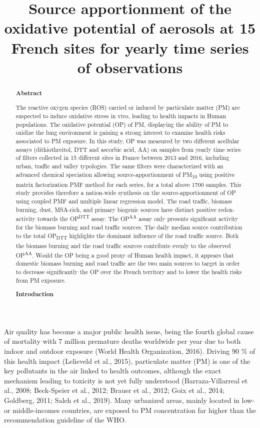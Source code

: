 \documentclass[
]{article}
\title{ Source apportionment of the oxidative potential of aerosols at
15 French sites for yearly time series of observations}
\author{}
\date{}
\begin{document}
\maketitle
\begin{abstract}
\textbf{Abstract}

The reactive oxygen species (ROS) carried or induced by particulate
matter (PM) are suspected to induce oxidative stress in vivo, leading to
health impacts in Human populations. The oxidative potential (OP) of PM,
displaying the ability of PM to oxidize the lung environment is gaining
a strong interest to examine health risks associated to PM exposure. In
this study, OP was measured by two different acellular assays
(dithiothreitol, DTT and ascorbic acid, AA) on samples from yearly time
series of filters collected in 15 different sites in France between 2013
and 2016, including urban, traffic and valley typologies. The same
filters were characterized with an advanced chemical speciation allowing
source-apportionment of PM\textsubscript{10} using positive matrix
factorization PMF method for each series, for a total above 1700
samples. This study provides therefore a nation-wide synthesis on the
source-apportionment of OP using coupled PMF and multiple linear
regression model. The road traffic, biomass burning, dust, MSA-rich, and
primary biogenic sources have distinct positive redox-activity towards
the OP\textsuperscript{DTT} assay. The OP\textsuperscript{AA} assay only
presents significant activity for the biomass burning and road traffic
sources. The daily median source contribution to the total
OP\textsubscript{DTT} highlights the dominant influence of the road
traffic source. Both the biomass burning and the road traffic sources
contribute evenly to the observed OP\textsuperscript{AA}. Would the OP
being a good proxy of Human health impact, it appears that domestic
biomass burning and road traffic are the two main sources to target in
order to decrease significantly the OP over the French territory and to
lower the health risks from PM exposure.

\textbf{Introduction}
\end{abstract}

Air quality has become a major public health issue, being the fourth
global cause of mortality with 7 million premature deaths worldwide per
year due to both indoor and outdoor exposure (World Health Organization,
2016). Driving 90 \% of this health impact (Lelieveld et al., 2015),
particulate matter (PM) is one of the key pollutants in the air linked
to health outcomes, although the exact mechanism leading to toxicity is
not yet fully understood (Barraza-Villarreal et al., 2008; Beck-Speier
et al., 2012; Brauer et al., 2012; Goix et al., 2014; Goldberg, 2011;
Saleh et al., 2019). Many urbanized areas, mainly located in low- or
middle-incomes countries, are exposed to PM concentration far higher
than the recommendation guideline of the WHO.
\end{document}
